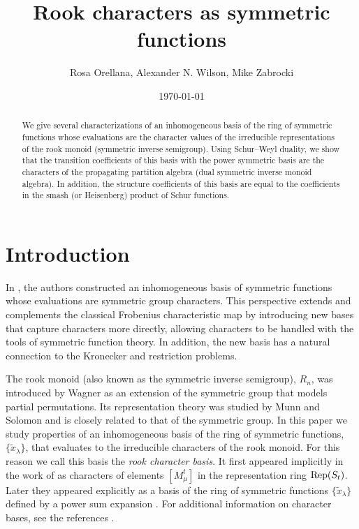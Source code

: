\documentclass{amsart}
\title[Rook characters as symmetric functions]{Rook characters as symmetric functions}
\author[R. Orellana, A. Wilson, M. Zabrocki]{Rosa Orellana, Alexander N. Wilson, Mike Zabrocki}
\date{\today}
\theoremstyle{definition}
\newcommand{\xt}{\tilde x}
\begin{document}
\begin{abstract}
We give several characterizations of an inhomogeneous basis of the ring of symmetric functions
whose evaluations are the character values of the irreducible representations
of the rook monoid (symmetric inverse semigroup).
Using Schur--Weyl duality, we show that the transition coefficients of this basis with the power symmetric basis are the characters of the propagating
partition algebra (dual symmetric inverse monoid algebra). In addition, the structure coefficients of this basis are equal to the coefficients in the smash (or Heisenberg) product of Schur functions.
\end{abstract}

\maketitle

\section{Introduction}
In \cite{OZ_character}, the authors constructed an inhomogeneous basis of symmetric functions whose evaluations are symmetric group characters. This perspective extends and complements the classical Frobenius characteristic map by introducing new bases that capture characters more directly, allowing characters to be handled with the tools of symmetric function theory. In addition, the new basis has a natural connection to the Kronecker and restriction problems. 

The rook monoid (also known as the symmetric inverse semigroup), $R_n$,
was introduced by Wagner \cite{Wagner52}
as an extension of the symmetric group that models partial permutations.
Its representation theory was studied by Munn \cite{M1957}
and Solomon \cite{solomon2002rep} and is closely related to that of the symmetric group.
In this paper we study properties of an inhomogeneous
basis of the ring of symmetric functions,
$\{ \xt_\lambda \}$, that evaluates to the irreducible characters of the rook monoid.
For this reason we call this basis the \emph{rook character basis}.
It first appeared implicitly in the
work of \cite{AS_specht} as characters of elements $[ M_\mu^t ]$ in the representation ring
${\rm Rep}(S_t)$. Later they appeared explicitly
as a basis of the ring of symmetric functions $\{\xt_\lambda\}$ defined by a power sum expansion
\cite[Equation (4)]{OZ_hopf}.  For additional
information on character bases, see the references
\cite{mitchell_lee, OZ_products, OZ_character, thibon}.
\end{document}
